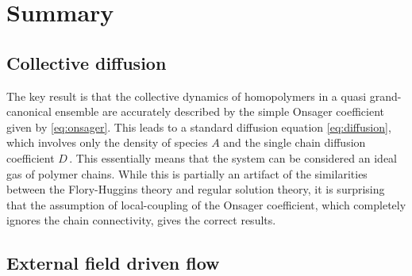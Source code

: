 \documentclass[bachelor,       %
               oneside,        %
               BCOR10mm,       %
               ngerman, english %
               ]{GAUBM}
\begin{document}

 

 

\chapter{Summary}

\section{Collective diffusion}

The key result is that the collective dynamics of homopolymers in a quasi grand-canonical ensemble are accurately described by the simple Onsager coefficient given by \autoref{eq:onsager}. This leads to a standard diffusion equation \autoref{eq:diffusion}, which involves only the density of species $A$ and the single chain diffusion coefficient $D\,.$ This essentially means that the system can be considered an ideal gas of polymer chains. While this is partially an artifact of the similarities between the Flory-Huggins theory and regular solution theory, it is surprising that the assumption of local-coupling of the Onsager coefficient, which completely ignores the chain connectivity, gives the correct results.

\section{External field driven flow}
\end{document}
